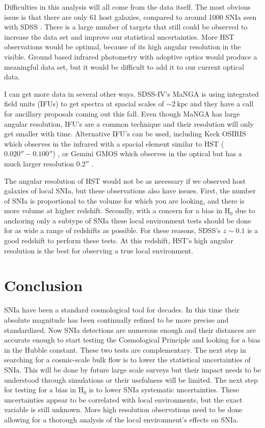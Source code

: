 \documentclass[apj, iop]{emulateapj}
\newcommand{\sn}{SNIa}
\newcommand{\Hubble}{\ensuremath{\text{H}_0}}
\begin{document}
Difficulties in this analysis will all come from the data itself. The most
obvious issue is that there are only 61 host galaxies, compared to around 1000
\sn{} seen with SDSS \citep{Campbell13}. There is a large number of targets
that still could be observed to increase the data set and improve our
statistical uncertainties. More HST observations would be optimal, because of
its high angular resolution in the visible. Ground based infrared photometry
with adoptive optics would produce a meaningful data set, but it would be
difficult to add it to our current optical data.

I can get more data in several other ways. SDSS-IV's MaNGA is using integrated
field units (IFUs) to get spectra at spacial scales of $\sim 2 ~\text{kpc}$ and
they have a call for ancillary proposals coming out this fall. Even though MaNGA
has large angular resolution, IFU's are a common technique and their resolution
will only get smaller with time. Alternative IFU's can be used, including Keck
OSIRIS which observes in the infrared with a spacial element similar to HST
($0.020'' - 0.100''$) \citep{OSIRIS},
or Gemini GMOS which observes in the optical but has a much larger resolution
$0.2''$ \citep{Gemini}.

The angular resolution of HST would not be as necessary if we observed host
galaxies of local \sn{}, but these observations also have issues. First, the
number of \sn{} is proportional to the volume for which you are looking, and
there is more volume at higher redshift. Secondly,
with a concern for a bias in \Hubble{} due to anchoring only a subtype of \sn{} 
these local environment tests should be done for
as wide a range of redshifts as possible. For these reasons, SDSS's $z \sim 0.1$
is a good redshift to perform these tests. At this redshift, HST's high angular
resolution is the best for observing a true local environment.

\section{Conclusion}

\sn{} have been a standard cosmological tool for decades. In this time their
absolute magnitude has been continually refined to be more precise and
standardized. Now \sn{} detections are numerous enough and their distances are
accurate enough to start testing the Cosmological Principle and looking for a
bias in the Hubble constant. These two tests are complementary.  The next
step in searching for a cosmic-scale bulk flow is to lower the statistical
uncertainties of \sn{}. This will be done by future large scale surveys but
their impact needs to be understood through simulations or their usefulness will
be limited.  The next step for testing for a bias in \Hubble{} is to lower \sn{}
systematic uncertainties. These uncertainties appear to be correlated with local
environments, but the exact variable is still unknown. More high resolution
observations need to be done allowing for a thorough analysis of the local
environment's effects on \sn{}.
\end{document}
